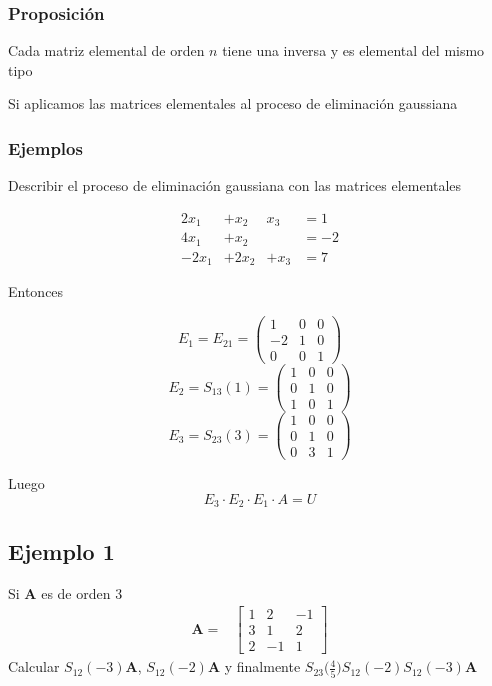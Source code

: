 \documentclass[
]{article}
\begin{document}
\hypertarget{proposiciuxf3n}{%
\subsubsection{Proposición}\label{proposiciuxf3n}}

Cada matriz elemental de orden \(n\) tiene una inversa y es elemental
del mismo tipo

Si aplicamos las matrices elementales al proceso de eliminación
gaussiana

\hypertarget{ejemplos-1}{%
\subsubsection{Ejemplos}\label{ejemplos-1}}

Describir el proceso de eliminación gaussiana con las matrices
elementales

\begin{equation*}
  \begin{matrix}
      2x_1  & + x_2 &  x_3  & = 1  \\
      4x_1  & + x_2 &       & =-2   \\
     -2x_1  & +2x_2 & +x_3  & =7
  \end{matrix}
\end{equation*}

Entonces

\[
E_1=E_{21}=\begin{pmatrix} 1 & 0 & 0 \\ -2 & 1 & 0 \\ 0 & 0& 1 \end{pmatrix}
\] \[
E_2=S_{13}(1)=\begin{pmatrix} 1 & 0 & 0 \\ 0 & 1 & 0 \\ 1 & 0& 1 \end{pmatrix}
\] \[
E_3=S_{23}(3)=\begin{pmatrix} 1 & 0 & 0 \\ 0 & 1 & 0 \\ 0 & 3& 1 \end{pmatrix}
\]

Luego \[
E_3\cdot E_2 \cdot E_1 \cdot A = U
\]

\hypertarget{ejemplo-1-3}{%
\subsection{Ejemplo 1}\label{ejemplo-1-3}}

Si \(\mathbf{A}\) es de orden 3 \begin{equation*}
\begin{array}{cc}
\mathbf{A}  =&  \begin{bmatrix} 1 & 2 & -1 \\
                                3 & 1 &  2 \\
                                2 & -1&  1
                 \end{bmatrix}
\end{array}
\end{equation*} Calcular \(S_{12}(-3)\mathbf{A}\),
\(S_{12}(-2)\mathbf{A}\) y finalmente
\(S_{23}\big(\frac{4}{5}\big)S_{12}(-2)S_{12}(-3)\mathbf{A}\)
\end{document}
